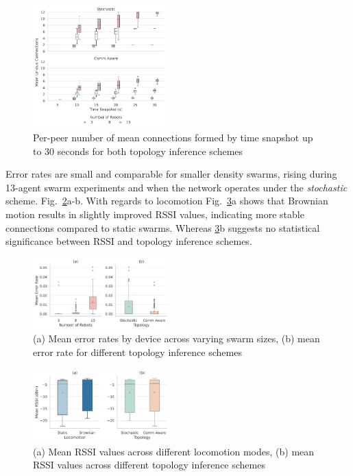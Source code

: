 \documentclass[conference]{IEEEtran}
\begin{document}
\begin{figure}[h]
    \centering
    \includegraphics[width=0.46\textwidth]{unique_connections.pdf}
    \caption{Per-peer number of mean connections formed by time snapshot up to 30 seconds for both topology inference schemes}
    \label{fig:unique-connections}
\end{figure}

Error rates are small and comparable for smaller density swarms, rising during 13-agent swarm experiments and when the network operates under the \emph{stochastic} scheme. Fig.~\ref{fig:error-rates}a-b. With regards to locomotion Fig.~\ref{fig:rssi}a shows that Brownian motion results in slightly improved RSSI values, indicating more stable connections compared to static swarms. Whereas \ref{fig:rssi}b suggests no statistical significance between RSSI and topology inference schemes. \\

\begin{figure}[h]
    \centering
    \includegraphics[width=0.47\textwidth]{reliability_impact.pdf}
    \caption{(a) Mean error rates by device across varying swarm sizes, (b) mean error rate for different topology inference schemes}
    \label{fig:error-rates}
\end{figure}

\begin{figure}[h]
    \centering
    \includegraphics[width=0.47\textwidth]{speed_impact.pdf}
    \caption{(a) Mean RSSI values across different locomotion modes, (b) mean RSSI values across different topology inference schemes}
    \label{fig:rssi}
\end{figure}
\end{document}
